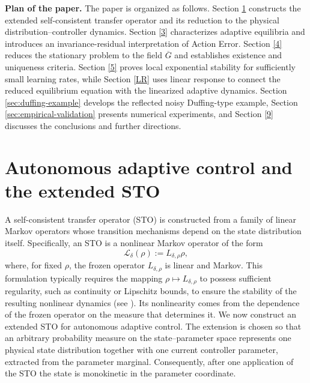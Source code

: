 \documentclass[11pt]{article}
\theoremstyle{definition}
\theoremstyle{remark}
\newcommand{\STO}{\mathcal{L}}
\newcommand{\Lin}{L}
\begin{document}
{\noindent \bf Plan of the paper.}
The paper is organized as follows.
Section \ref{2} constructs the extended self-consistent transfer
operator and its reduction to the physical distribution--controller
dynamics.
Section \ref{3} characterizes adaptive equilibria and introduces an
invariance-residual interpretation of Action Error.
Section \ref{4} reduces the stationary problem to the field
\(\overline G\) and establishes existence and uniqueness criteria.
Section \ref{5} proves local exponential stability for sufficiently
small learning rates, while Section \ref{LR} uses linear response
to connect the reduced equilibrium equation with the
linearized adaptive dynamics.
Section \ref{sec:duffing-example} develops the reflected noisy Duffing-type example,
Section \ref{sec:empirical-validation} presents numerical experiments, and Section \ref{9}
discusses the conclusions and further directions.


\section{Autonomous adaptive control and the extended STO}
\label{2}


A self-consistent transfer operator (STO) is constructed from a family of linear Markov operators whose transition mechanisms depend on the state distribution itself. Specifically, an STO is a nonlinear Markov operator of the form
\begin{equation}
  \STO_\delta(\rho):=\Lin_{\delta,\rho}\rho,
  \label{eq:abstract-sto}
\end{equation}
where, for fixed \(\rho\), the frozen operator \(\Lin_{\delta,\rho}\) is
linear and Markov. This formulation typically requires the mapping \(\rho \mapsto \Lin_{\delta,\rho}\) to possess sufficient regularity, such as continuity or Lipschitz bounds, to ensure the stability of the resulting nonlinear dynamics (see \cite{GalatoloCMP}). Its nonlinearity comes from the dependence of the frozen
operator on the measure that determines it.  We now construct an extended STO
for autonomous adaptive control.  The extension is chosen so that an arbitrary
probability measure on the state--parameter space represents one physical
state distribution together with one current controller parameter, extracted
from the parameter marginal.  Consequently, after one application of the STO
the state is monokinetic in the parameter coordinate.
\end{document}
